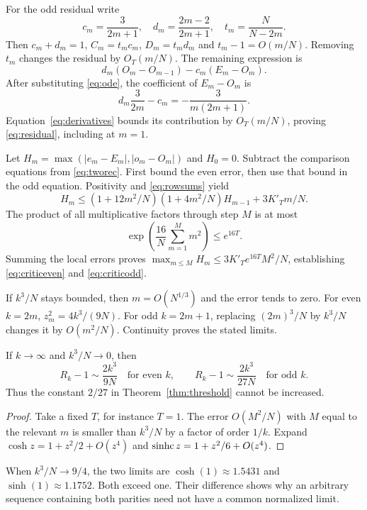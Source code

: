 For the odd residual write
\[
c_m=\frac3{2m+1},\quad d_m=\frac{2m-2}{2m+1},\quad t_m=\frac N{N-2m}.
\]
Then $c_m+d_m=1$, $C_m=t_mc_m$, $D_m=t_md_m$ and $t_m-1=O(m/N)$. Removing $t_m$ changes the residual by $O_T(m/N)$. The remaining expression is
\[
d_m(O_m-O_{m-1})-c_m(E_m-O_m).
\]
After substituting \eqref{eq:ode}, the coefficient of $E_m-O_m$ is
\[
d_m\frac3{2m}-c_m=-\frac3{m(2m+1)}.
\]
Equation~\eqref{eq:derivatives} bounds its contribution by $O_T(m/N)$, proving \eqref{eq:residual}, including at $m=1$.

Let $H_m=\max(|e_m-E_m|,|o_m-O_m|)$ and $H_0=0$. Subtract the comparison equations from \eqref{eq:tworec}. First bound the even error, then use that bound in the odd equation. Positivity and \eqref{eq:rowsums} yield
\[
H_m\le(1+12m^2/N)(1+4m^2/N)H_{m-1}+3K'_Tm/N.
\]
The product of all multiplicative factors through step $M$ is at most
\[
\exp\left(\frac{16}N\sum_{m=1}^M m^2\right)\le e^{16T}.
\]
Summing the local errors proves $\max_{m\le M}H_m\le3K'_Te^{16T}M^2/N$, establishing \eqref{eq:criticeven} and \eqref{eq:criticodd}.

If $k^3/N$ stays bounded, then $m=O(N^{1/3})$ and the error tends to zero. For even $k=2m$, $z_m^2=4k^3/(9N)$. For odd $k=2m+1$, replacing $(2m)^3/N$ by $k^3/N$ changes it by $O(m^2/N)$. Continuity proves the stated limits.

\begin{corollary}\label{cor:small}
If $k\to\infty$ and $k^3/N\to0$, then
\[
R_k-1\sim\frac{2k^3}{9N}\quad\text{for even }k,
\qquad
R_k-1\sim\frac{2k^3}{27N}\quad\text{for odd }k.
\]
Thus the constant $2/27$ in Theorem~\ref{thm:threshold} cannot be increased.
\end{corollary}
\begin{proof}
Take a fixed $T$, for instance $T=1$. The error $O(M^2/N)$ with $M$ equal to the relevant $m$ is smaller than $k^3/N$ by a factor of order $1/k$. Expand $\cosh z=1+z^2/2+O(z^4)$ and $\operatorname{sinhc} z=1+z^2/6+O(z^4)$.
\end{proof}

\begin{example}
When $k^3/N\to9/4$, the two limits are $\cosh(1)\approx1.5431$ and $\sinh(1)\approx1.1752$. Both exceed one. Their difference shows why an arbitrary sequence containing both parities need not have a common normalized limit.
\end{example}

